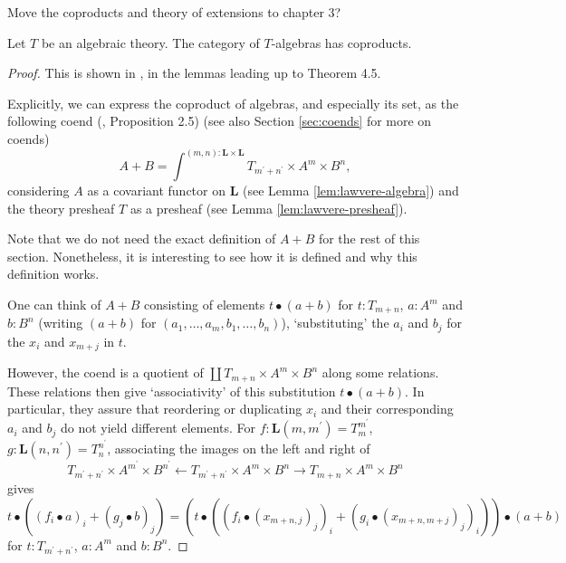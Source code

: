 \TODO Move the coproducts and theory of extensions to chapter 3?

\begin{lemma}
  Let $ T $ be an algebraic theory. The category of $ T $-algebras has coproducts.
\end{lemma}
\begin{proof}
  This is shown in \autocite{algebaric-theories-2010}, in the lemmas leading up to Theorem 4.5.

  Explicitly, we can express the coproduct of algebras, and especially its set, as the following coend (\autocite{Hyland}, Proposition 2.5) (see also Section \ref{sec:coends} for more on coends)
  \[ A + B = \int^{(m, n) : \mathbf L \times \mathbf L} T_{m^\prime + n^\prime} \times A^m \times B^n, \]
  considering $ A $ as a covariant functor on $ \mathbf L $ (see Lemma \ref{lem:lawvere-algebra}) and the theory presheaf $ T $ as a presheaf (see Lemma \ref{lem:lawvere-presheaf}).

  Note that we do not need the exact definition of $ A + B $ for the rest of this section. Nonetheless, it is interesting to see how it is defined and why this definition works.

  One can think of $ A + B $ consisting of elements $ t \bullet (a + b) $ for $ t: T_{m + n} $, $ a : A^m $ and $ b: B^n $ (writing $ (a + b) $ for $ (a_1, \dots, a_m, b_1, \dots, b_n) $), `substituting' the $ a_i $ and $ b_j $ for the $ x_i $ and $ x_{m + j} $ in $ t $.

  However, the coend is a quotient of $ \coprod T_{m + n} \times A^m \times B^n $ along some relations. These relations then give `associativity' of this substitution $ t \bullet (a + b) $. In particular, they assure that reordering or duplicating $ x_i $ and their corresponding $ a_i $ and $ b_j $ do not yield different elements. For $ f: \mathbf L(m, m^\prime) = T_m^{m^\prime} $, $ g: \mathbf L(n, n^\prime) = T_n^{n^\prime} $, associating the images on the left and right of
  \[ T_{m^\prime + n^\prime} \times A^{m^\prime} \times B^{n^\prime} \leftarrow T_{m^\prime + n^\prime} \times A^m \times B^n \rightarrow T_{m + n} \times A^m \times B^n \]
  gives
  \[ t \bullet ((f_i \bullet a)_i + (g_j \bullet b)_j) = (t \bullet ((f_i \bullet (x_{m + n, j})_j)_i + (g_i \bullet (x_{m + n, m + j})_j)_i)) \bullet (a + b) \]
  for $ t : T_{m^\prime + n^\prime} $, $ a : A^m $ and $ b : B^n $.


\end{proof}
